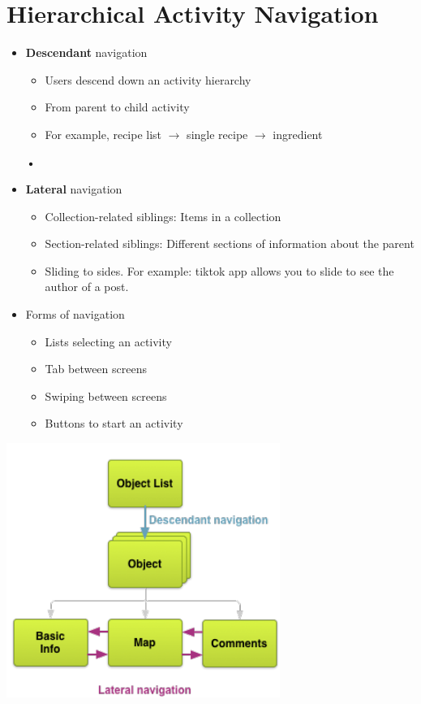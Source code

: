 \documentclass{article}
\begin{document}
\section{Hierarchical	Activity Navigation}

\begin{multicols}{2}
\begin{itemize}
\item \textbf{Descendant} navigation
\begin{itemize}
  \item Users descend down an activity hierarchy
  \item From parent to child activity
  \item For example, recipe list $\rightarrow$ single recipe $\rightarrow$ ingredient
\end{itemize}\textbf{•}
\item \textbf{Lateral} navigation
\begin{itemize}
  \item Collection-related siblings: Items in a collection
  \item Section-related siblings: Different sections of information about the parent
  \item Sliding to sides. For example: tiktok app allows you to slide to see the author of a post.
\end{itemize}
\item Forms	of	navigation
\begin{itemize}
  \item Lists selecting an activity
  \item Tab between screens
  \item Swiping between screens
  \item Buttons to start an activity
\end{itemize}
\end{itemize}

\vfill\null

\includegraphics[scale=0.6]{navigation.png}

\end{multicols}
\end{document}
